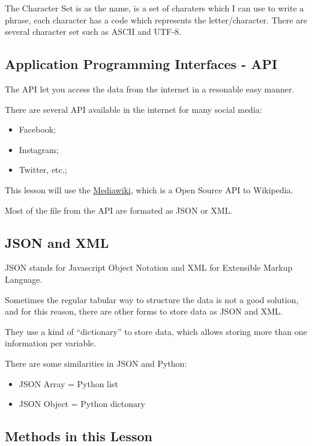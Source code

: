 \documentclass[]{book}
\providecommand{\tightlist}{%
  \setlength{\itemsep}{0pt}\setlength{\parskip}{0pt}}
\begin{document}
The Character Set is as the name, is a set of charaters which I can use
to write a phrase, each character has a code which represents the
letter/character. There are several character set such as ASCII and
UTF-8.

\subsection{Application Programming Interfaces -
API}\label{application-programming-interfaces---api}

The API let you access the data from the internet in a resonable easy
manner.

There are several API available in the internet for many social media:

\begin{itemize}
\tightlist
\item
  Facebook;
\item
  Instagram;
\item
  Twitter, etc.;
\end{itemize}

This lesson will use the
\href{https://www.mediawiki.org/wiki/MediaWiki}{Mediawiki}, which is a
Open Source API to Wikipedia.

Most of the file from the API are formated as JSON or XML.

\subsection{JSON and XML}\label{json-and-xml}

JSON stands for Javascript Object Notation and XML for Extensible Markup
Language.

Sometimes the regular tabular way to structure the data is not a good
solution, and for this reason, there are other forms to store data as
JSON and XML.

They use a kind of ``dictionary'' to store data, which allows storing
more than one information per variable.

There are some similarities in JSON and Python:

\begin{itemize}
\tightlist
\item
  JSON Array = Python list
\item
  JSON Object = Python dictonary
\end{itemize}

\subsection{Methods in this Lesson}\label{methods-in-this-lesson}
\end{document}
